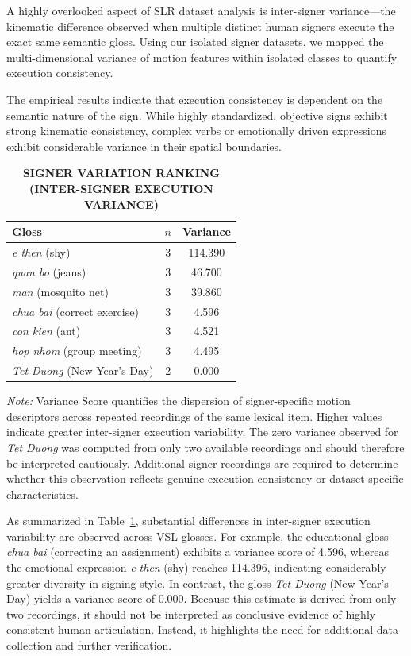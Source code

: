 \documentclass{ieeeaccess}
\DeclareRobustCommand{\textbf}[1]{{\bfseries #1}}
\begin{document}
A highly overlooked aspect of SLR dataset analysis is inter-signer variance—the kinematic difference observed when multiple distinct human signers execute the exact same semantic gloss. Using our isolated signer datasets, we mapped the multi-dimensional variance of motion features within isolated classes to quantify execution consistency.

The empirical results indicate that execution consistency is dependent on the semantic nature of the sign. While highly standardized, objective signs exhibit strong kinematic consistency, complex verbs or emotionally driven expressions exhibit considerable variance in their spatial boundaries. 

\begin{table}[!t]
\caption{\textbf{SIGNER VARIATION RANKING (INTER-SIGNER EXECUTION VARIANCE)}}
\label{tab:variation}

\centering
\small
\setlength{\tabcolsep}{10pt}

\begin{tabular}{|p{2.5cm}|c|c|}
\hline
\textbf{Gloss} &
\textbf{$n$} &
\textbf{Variance} \\
\hline
\emph{e then} (shy) & 3 & 114.390\\
\hline
\emph{quan bo} (jeans) & 3 & 46.700\\
\hline
\emph{man} (mosquito net) & 3 & 39.860 \\
\hline
\emph{chua bai} (correct exercise) & 3 & 4.596\\
\hline
\emph{con kien} (ant) & 3 & 4.521\\
\hline
\emph{hop nhom} (group meeting) & 3 & 4.495\\
\hline
\emph{Tet Duong} (New Year's Day) & 2 & 0.000\\
\hline
\end{tabular}
\end{table}

\noindent
\footnotesize
\textit{Note:}
Variance Score quantifies the dispersion of signer-specific motion descriptors across repeated recordings of the same lexical item. Higher values indicate greater inter-signer execution variability. The zero variance observed for \emph{Tet Duong} was computed from only two available recordings and should therefore be interpreted cautiously. Additional signer recordings are required to determine whether this observation reflects genuine execution consistency or dataset-specific characteristics.

As summarized in Table~\ref{tab:variation}, substantial differences in inter-signer execution variability are observed across VSL glosses. For example, the educational gloss \emph{chua bai} (correcting an assignment) exhibits a variance score of 4.596, whereas the emotional expression \emph{e then} (shy) reaches 114.396, indicating considerably greater diversity in signing style. In contrast, the gloss \emph{Tet Duong} (New Year's Day) yields a variance score of 0.000. Because this estimate is derived from only two recordings, it should not be interpreted as conclusive evidence of highly consistent human articulation. Instead, it highlights the need for additional data collection and further verification.
\end{document}
